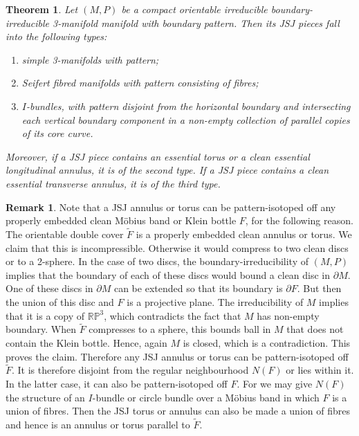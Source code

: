 \documentclass[oneside]{amsart}
\numberwithin{equation}{section}
\theoremstyle{plain}
\newtheorem{theorem}[equation]{Theorem}
\theoremstyle{definition}
\newtheorem{remark}[equation]{Remark}
\begin{document}
\begin{theorem}
\label{Thm:JSJPieces}
Let $(M,P)$ be a compact orientable irreducible boundary-irreducible 3-manifold manifold with boundary pattern. Then its JSJ pieces fall into the following types:
\begin{enumerate}
\item simple 3-manifolds with pattern;
\item Seifert fibred manifolds with pattern consisting of fibres;
\item $I$-bundles, with pattern disjoint from the horizontal boundary and intersecting each vertical boundary component in a non-empty collection of parallel copies of its core curve.
\end{enumerate}
Moreover, if a JSJ piece contains an essential torus or a clean essential longitudinal annulus, it is of the second type. If a JSJ piece contains a clean essential transverse annulus, it is of the third type.
\end{theorem}

\begin{remark}\label{Rem:IsotopeOffMob}
Note that a JSJ annulus or torus can be pattern-isotoped off any properly embedded clean M\"obius
band or Klein bottle $F$, for the following reason. The orientable double cover $\tilde F$ is a properly embedded
clean annulus or torus. We claim that this is incompressible. Otherwise it would compress to two clean
discs or to a 2-sphere. In the case of two discs, the boundary-irreducibility of
$(M,P)$ implies that the boundary of each of these discs would bound a clean disc in $\partial M$.
One of these discs in $\partial M$ can be extended so that its boundary is $\partial F$.
But then the union of this disc and $F$ is a projective plane. The irreducibility of $M$
implies that it is a copy of $\mathbb{RP}^3$, which contradicts the fact that
$M$ has non-empty boundary. When $\tilde F$ compresses to a sphere, this bounds
ball in $M$ that does not contain the Klein bottle. Hence, again $M$ is closed, which is
a contradiction. This proves the claim.
Therefore any JSJ annulus or torus can be pattern-isotoped off $\tilde F$. It is therefore
disjoint from the regular neighbourhood $N(F)$ or lies within it. In the latter case, it can also
be pattern-isotoped off $F$. For we may give $N(F)$ the structure of an $I$-bundle or circle bundle
over a M\"obius band in which $F$ is a union of fibres. Then the JSJ torus or annulus
can also be made a union of fibres and hence is an annulus or torus parallel to $\tilde F$.
\end{remark}
\end{document}
